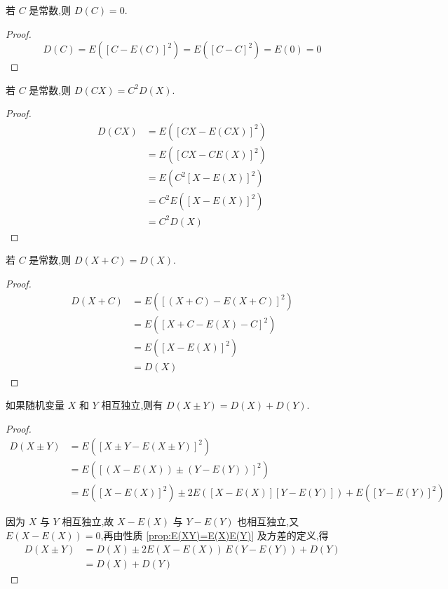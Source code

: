 \begin{property}
    \indent 若 $C$ 是常数,则 $D(C) = 0$.
\end{property}

\begin{proof}
    $$
    D(C) = E([C-E(C)]^2) = E([C-C]^2) = E(0) = 0
    $$
\end{proof}

\begin{property}
    \indent 若 $C$ 是常数,则 $D(CX) = C^2 D(X)$.
\end{property}

\begin{proof}
    $$
    \begin{aligned}
        D(CX) &= E([CX - E(CX)]^2) \\
        &= E([CX - CE(X)]^2) \\
        &= E(C^2 [X-E(X)]^2) \\
        &= C^2 E([X-E(X)]^2) \\
        &= C^2 D(X)
    \end{aligned}
    $$
\end{proof}

\begin{property}
    \indent 若 $C$ 是常数,则 $D(X+C) = D(X)$.
\end{property}

\begin{proof}
    $$
    \begin{aligned}
        D(X+C) &= E([(X+C) - E(X+C)]^2) \\
        &= E([X + C - E(X) - C]^2) \\
        &= E([X-E(X)]^2) \\
        &= D(X)
    \end{aligned}
    $$
\end{proof}

\begin{property}[][][prop:D(X+Y)=D(X)+D(Y)]
    \indent 如果随机变量 $X$ 和 $Y$ 相互独立,则有 $D(X \pm Y) = D(X)+D(Y)$.
\end{property}

\begin{proof}
    $$
    \begin{aligned}
        D(X \pm Y) &= E([X \pm Y - E(X \pm Y)]^2) \\
        &= E([(X-E(X)) \pm (Y-E(Y))]^2) \\
        &= E([X-E(X)]^2) \pm 2E([X-E(X)][Y-E(Y)]) + E([Y-E(Y)]^2)
    \end{aligned}
    $$

    因为 $X$ 与 $Y$ 相互独立,故 $X-E(X)$ 与 $Y-E(Y)$ 也相互独立,又 $E(X-E(X)) = 0$,再由性质 \ref{prop:E(XY)=E(X)E(Y)} 及方差的定义,得
    $$
    \begin{aligned}
        D(X \pm Y) &= D(X) \pm 2E(X-E(X)) \, E(Y-E(Y)) + D(Y) \\
        &= D(X) + D(Y)
    \end{aligned}
    $$
\end{proof}

